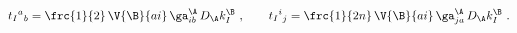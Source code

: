 \begin{equation}
  {t_I}^a{}_b = \frc{1}{2}\, \V{\B}{ai}\, \ga^\A_{ib}\, D_\A k^\B_I\
  ,\qquad {t_I}^i{}_j = \frc{1}{2n}\, \V{\B}{ai}\, \ga^\A_{ja}\, D_\A
  k^\B_I\ .\label{t-matrices}
 \end{equation}

